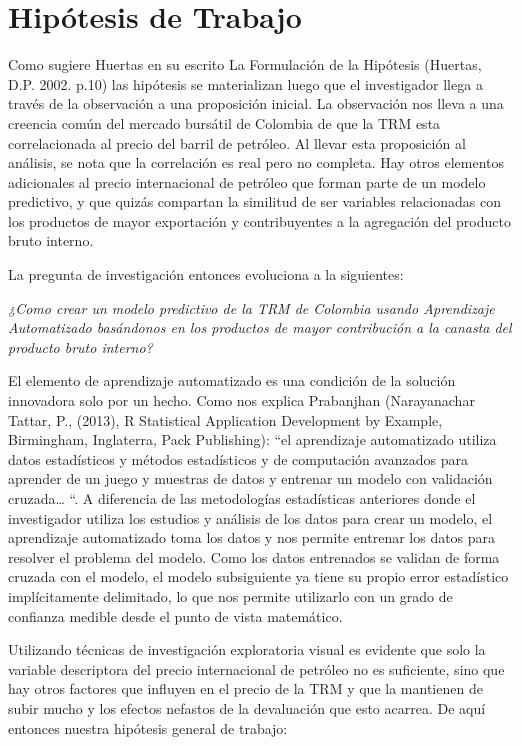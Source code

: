 \section{Hipótesis de Trabajo }
Como sugiere Huertas en su escrito La Formulación de la Hipótesis (Huertas, D.P. 2002. p.10) las hipótesis se materializan luego que el investigador llega a través de la observación a una proposición inicial. La observación nos lleva a una creencia común del mercado bursátil de Colombia de que la TRM esta correlacionada al precio del barril de petróleo. Al llevar esta proposición al análisis, se nota que la correlación es real pero no completa. Hay otros elementos adicionales al precio internacional de petróleo que forman parte de un modelo predictivo, y que quizás compartan la similitud de ser variables relacionadas con los productos de mayor exportación y contribuyentes a la agregación del producto bruto interno.

La pregunta de investigación entonces evoluciona a la siguientes:

\emph{¿Como crear un modelo predictivo de la TRM de Colombia usando Aprendizaje Automatizado basándonos en los productos de mayor contribución a la canasta del producto bruto interno?}

El elemento de aprendizaje automatizado es una condición de la solución innovadora solo por un hecho. Como nos explica Prabanjhan (Narayanachar Tattar, P., (2013), R Statistical Application Development by Example, Birmingham, Inglaterra, Pack Publishing): “el aprendizaje automatizado utiliza datos estadísticos y métodos estadísticos y de computación avanzados para aprender de un juego y muestras de datos y entrenar un modelo con validación cruzada… “. A diferencia de las metodologías estadísticas anteriores donde el investigador utiliza los estudios y análisis de los datos para crear un modelo, el aprendizaje automatizado toma los datos y nos permite entrenar los datos para resolver el problema del modelo. Como los datos entrenados se validan de forma cruzada con el modelo, el modelo subsiguiente ya tiene su propio error estadístico implícitamente delimitado, lo que nos permite utilizarlo con un grado de confianza medible desde el punto de vista matemático.

Utilizando técnicas de investigación exploratoria visual es evidente que solo la variable descriptora del precio internacional de petróleo no es suficiente, sino que hay otros factores que influyen en el precio de la TRM y que la mantienen de subir mucho y los efectos nefastos de la devaluación que esto acarrea. De aquí entonces nuestra hipótesis general de trabajo:

